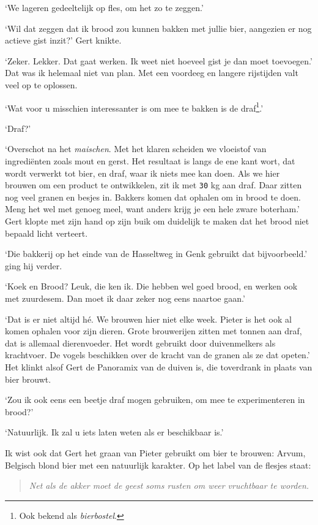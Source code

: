 \documentclass[
  11pt,
  dutch,
]{memoir}
\begin{document}
`We lageren gedeeltelijk op fles, om het zo te zeggen.'

`Wil dat zeggen dat ik brood zou kunnen bakken met jullie bier,
aangezien er nog actieve gist inzit?' Gert knikte.

`Zeker. Lekker. Dat gaat werken. Ik weet niet hoeveel gist je dan moet
toevoegen.' Dat was ik helemaal niet van plan. Met een voordeeg en
langere rijstijden valt veel op te oplossen.

`Wat voor u misschien interessanter is om mee te bakken is de
draf\footnote{Ook bekend als \emph{bierbostel}.}.'

`Draf?'

`Overschot na het \emph{maischen}. Met het klaren scheiden we vloeistof
van ingrediënten zoals mout en gerst. Het resultaat is langs de ene kant
wort, dat wordt verwerkt tot bier, en draf, waar ik niets mee kan doen.
Als we hier brouwen om een product te ontwikkelen, zit ik met
\texttt{30} kg aan draf. Daar zitten nog veel granen en besjes in.
Bakkers komen dat ophalen om in brood te doen. Meng het wel met genoeg
meel, want anders krijg je een hele zware boterham.' Gert klopte met
zijn hand op zijn buik om duidelijk te maken dat het brood niet bepaald
licht verteert.

`Die bakkerij op het einde van de Hasseltweg in Genk gebruikt dat
bijvoorbeeld.' ging hij verder.

`Koek en Brood? Leuk, die ken ik. Die hebben wel goed brood, en werken
ook met zuurdesem. Dan moet ik daar zeker nog eens naartoe gaan.'

`Dat is er niet altijd hé. We brouwen hier niet elke week. Pieter is het
ook al komen ophalen voor zijn dieren. Grote brouwerijen zitten met
tonnen aan draf, dat is allemaal dierenvoeder. Het wordt gebruikt door
duivenmelkers als krachtvoer. De vogels beschikken over de kracht van de
granen als ze dat opeten.' Het klinkt alsof Gert de Panoramix van de
duiven is, die toverdrank in plaats van bier brouwt.

`Zou ik ook eens een beetje draf mogen gebruiken, om mee te
experimenteren in brood?'

`Natuurlijk. Ik zal u iets laten weten als er beschikbaar is.'

Ik wist ook dat Gert het graan van Pieter gebruikt om bier te brouwen:
Arvum, Belgisch blond bier met een natuurlijk karakter. Op het label van
de flesjes staat:

\begin{quote}
\emph{Net als de akker moet de geest soms rusten om weer vruchtbaar te
worden.}
\end{quote}
\end{document}

